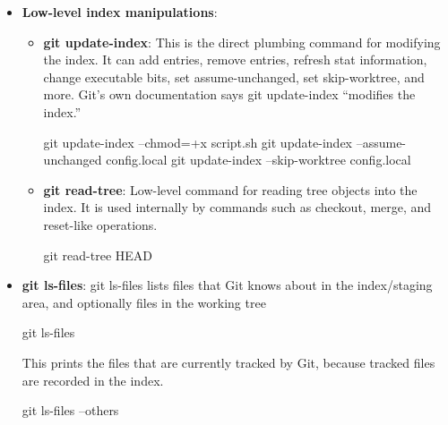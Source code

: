 \documentclass{report}
\begin{document}
\begin{itemize}
\begin{itemize}
\begin{bashcode}
                        git stash --staged
                        git stash --keep-index
                        git stash pop
                        git stash apply
                    \end{bashcode}
                    \bigbreak \noindent 
                    git stash pop and git stash apply can also modify the index depending on how the stash was created and applied.
            \end{itemize}
        \item \textbf{Low-level index manipulations}:
            \begin{itemize}
                \item \textbf{git update-index}: This is the direct plumbing command for modifying the index. It can add entries, remove entries, refresh stat information, change executable bits, set assume-unchanged, set skip-worktree, and more. Git’s own documentation says git update-index “modifies the index.”
                    \bigbreak \noindent 
                    \begin{bashcode}
                        git update-index --chmod=+x script.sh
                        git update-index --assume-unchanged config.local
                        git update-index --skip-worktree config.local
                    \end{bashcode}
                \item \textbf{git read-tree}: Low-level command for reading tree objects into the index. It is used internally by commands such as checkout, merge, and reset-like operations.
                    \bigbreak \noindent 
                    \begin{bashcode}
                        git read-tree HEAD
                    \end{bashcode}
            \end{itemize}
        \item \textbf{git ls-files}: git ls-files lists files that Git knows about in the index/staging area, and optionally files in the working tree
            \bigbreak \noindent 
            \begin{bashcode}
                git ls-files
            \end{bashcode}
            \bigbreak \noindent 
            This prints the files that are currently tracked by Git, because tracked files are recorded in the index.
            \bigbreak \noindent 
            \begin{bashcode}
                git ls-files --others

\end{bashcode}
\end{itemize}
\end{document}
